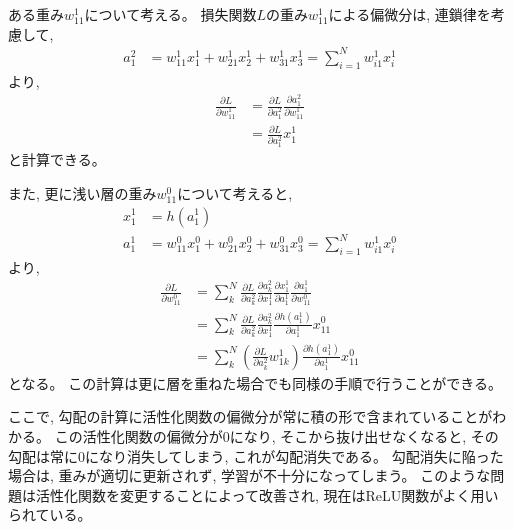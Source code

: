 ある重み$w^1_{11}$について考える。
損失関数$L$の重み$w^1_{11}$による偏微分は, 連鎖律を考慮して, 
\begin{equation}
 \begin{split}
  a^2_1 &= w^1_{11} x^1_1 + w^1_{21} x^1_2 + w^1_{31} x^1_3 = \sum^N_{i=1} w^1_{i1} x^1_i
 \end{split}
\end{equation}
より, 
\begin{equation}
 \begin{split}
  \frac{\partial L}{\partial w^1_{11}} 
  &= \frac{\partial L}{\partial a^2_1}\frac{\partial a^2_1}{\partial w^1_{11}}\\
  &= \frac{\partial L}{\partial a^2_1}x^1_{1}
 \end{split}
\end{equation}
と計算できる。

また, 更に浅い層の重み$w^0_{11}$について考えると, 
\begin{equation}
 \begin{split}
  x^1_1 &= h(a^1_1)\\
  a^1_1 &= w^0_{11} x^0_1 + w^0_{21} x^0_2 + w^0_{31} x^0_3 = \sum^N_{i=1} w^1_{i1} x^0_i
 \end{split}
\end{equation}
より, 
\begin{equation}
 \begin{split}
  \frac{\partial L}{\partial w^0_{11}} 
  &= \sum^N_{k} \frac{\partial L}{\partial a^2_k}\frac{\partial a^2_k}{\partial x^1_1}\frac{\partial x^1_1}{\partial a^1_1}\frac{\partial a^1_1}{\partial w^0_{11}}\\
  &= \sum^N_{k} \frac{\partial L}{\partial a^2_k}\frac{\partial a^2_k}{\partial x^1_1}\frac{\partial h(a^1_1)}{\partial a^1_1}x^0_{11}\\
  &= \sum^N_{k} \left(\frac{\partial L}{\partial a^2_k}w^1_{1k}\right)\frac{\partial h(a^1_1)}{\partial a^1_1}x^0_{11}
 \end{split}
\end{equation}
となる。
この計算は更に層を重ねた場合でも同様の手順で行うことができる。

ここで, 勾配の計算に活性化関数の偏微分が常に積の形で含まれていることがわかる。
この活性化関数の偏微分が$0$になり, そこから抜け出せなくなると, その勾配は常に$0$になり消失してしまう, これが勾配消失である。
勾配消失に陥った場合は, 重みが適切に更新されず, 学習が不十分になってしまう。
このような問題は活性化関数を変更することによって改善され, 現在はReLU関数がよく用いられている。

